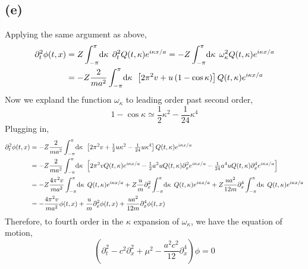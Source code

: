 \documentclass[12pt]{extarticle}
\begin{document}
\subsection*{(e)}
Applying the same argument as above,
\begin{align*} 
\partial_t^2 \phi(t, x) & = Z \int_{-\pi}^\pi \! \mathrm{d}\kappa \: \: \partial_t^2 Q(t, \kappa) e^{i \kappa x / a} = - Z \int_{-\pi}^\pi \! \mathrm{d}\kappa \: \: \omega_\kappa^2 Q(t, \kappa) e^{i \kappa x / a} \\
& = - Z \frac{2}{m a^2} \int_{-\pi}^\pi \! \mathrm{d}\kappa \: \: \left[ 2 \pi^2 v + u \left(1 - \cos{\kappa}\right) \right] Q(t, \kappa) e^{i \kappa x / a}
\end{align*}
Now we expland the function $\omega_\kappa$ to leading order past second order,
\[1 - \cos{\kappa} \simeq \frac{1}{2} \kappa^2 - \frac{1}{24} \kappa^4 \]
Plugging in,
\begin{align*}
\partial_t^2 \phi(t, x) & = - Z \frac{2}{m a^2} \int_{-\pi}^\pi \! \mathrm{d}\kappa \: \: \left[ 2 \pi^2 v + \tfrac{1}{2} u \kappa^2 - \tfrac{1}{24} u \kappa^4 \right] Q(t, \kappa) e^{i \kappa x / a} \\
& = - Z \frac{2}{m a^2} \int_{-\pi}^\pi \! \mathrm{d}\kappa \: \: \left[ 2 \pi^2 v Q(t, \kappa) e^{i \kappa x / a}  - \tfrac{1}{2} a ^2 u Q(t, \kappa) \partial_x^2  e^{i \kappa x / a}  - \tfrac{1}{24} a^4 u Q(t, \kappa) \partial_x^4 e^{i \kappa x / a} \right] \\
& = - Z \frac{4 \pi^2 v}{m a^2} \int_{-\pi}^\pi \! \mathrm{d}\kappa \: \: Q(t, \kappa) e^{i \kappa x / a}  + Z \frac{u}{m} \partial_x^2 \int_{-\pi}^\pi \! \mathrm{d}\kappa \: \:  Q(t, \kappa)  e^{i \kappa x / a} + Z \frac{u a^2}{12 m} \partial_x^4 \int_{-\pi}^\pi \! \mathrm{d}\kappa \: \:  Q(t, \kappa)  e^{i \kappa x / a} \\
& = - \frac{4 \pi^2 v}{m a^2} \phi(t, x) + \frac{u}{m} \partial_x^2 \phi(t, x) + \frac{u a^2}{12 m} \partial_x^4 \phi(t, x)
\end{align*} 
Therefore, to fourth order in the $\kappa$ expansion of $\omega_\kappa$, we have the equation of motion,
\[\left(\partial_t^2 - c^2 \partial_x^2 + \mu^2 - \frac{a^2 c^2}{12} \partial_x^4 \right) \phi = 0\]
\end{document}
